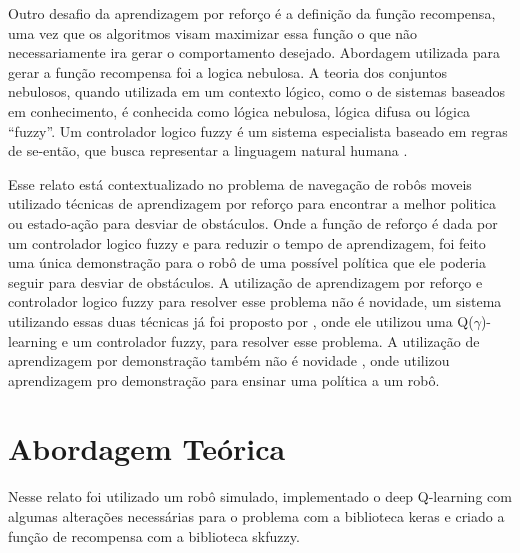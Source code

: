 \documentclass[
	12pt,				%
	openright,			%
	oneside,			%
	a4paper,			%
	brazil,				%
	]{abntex2}
\begin{document}
Outro desafio da aprendizagem por reforço é a definição da função recompensa, uma vez que os algoritmos visam maximizar essa função o que não necessariamente ira gerar o comportamento desejado. Abordagem utilizada para gerar a função recompensa foi a logica nebulosa. A teoria dos conjuntos nebulosos, quando utilizada em um contexto lógico, como o de sistemas baseados em conhecimento, é conhecida como lógica nebulosa, lógica difusa ou lógica “fuzzy”\cite{sandri1999logica}. Um controlador logico fuzzy é um sistema especialista baseado em regras de se-então, que busca representar a linguagem natural humana \cite{duan2005fuzzy}.

Esse relato está contextualizado no problema de navegação de robôs moveis utilizado técnicas de aprendizagem por reforço para encontrar a melhor politica ou estado-ação para desviar de obstáculos. Onde a função de reforço é dada por um controlador logico fuzzy e para reduzir o tempo de aprendizagem, foi feito uma única demonstração para o robô de uma possível política que ele poderia seguir para desviar de obstáculos. A utilização de aprendizagem por reforço e controlador logico fuzzy para resolver esse problema não é novidade, um sistema utilizando essas duas técnicas já foi proposto por \cite{duan2005fuzzy}, onde ele utilizou uma Q($\gamma$)-learning e um controlador fuzzy, para resolver esse problema. A utilização de aprendizagem por demonstração também não é novidade , onde  \cite{argall2009survey} utilizou aprendizagem pro demonstração para ensinar uma política a um robô.


\chapter{Abordagem Teórica}\label{Teoria}

Nesse relato foi utilizado um robô simulado, implementado o deep Q-learning com algumas alterações necessárias para o problema com a biblioteca keras e criado a função de recompensa com a biblioteca skfuzzy.
 
\end{document}
